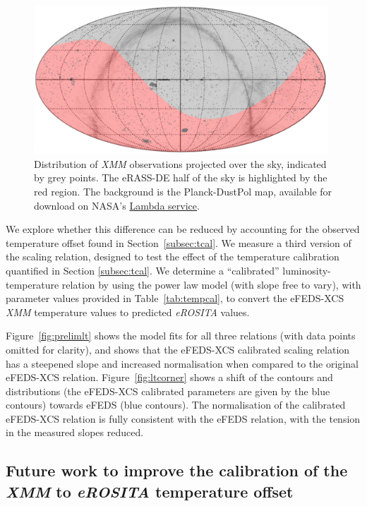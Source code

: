 \documentclass[fleqn,usenatbib]{mnras}
\begin{document}
\begin{figure}
    \centering
    \includegraphics[width=0.98\textwidth]{images/XCS_eRASSd.png}
    \caption[]{Distribution of {\em XMM} observations projected over the sky, indicated by grey points. The eRASS-DE half of the sky is highlighted by the red region. The background is the Planck-DustPol \citep[][]{dustpol} map, available for download on NASA's \href{http://lambda.gsfc.nasa.gov/data/footprint-maps/Planck_DustPol_Amp_256.fits.gz
}{Lambda service}.} 
    \label{fig:germanerassxmm}
\end{figure}

We explore whether this difference can be reduced by accounting for the observed temperature offset found in Section~\ref{subsec:tcal}. We measure a third version of the scaling relation, designed to test the effect of the temperature calibration quantified in Section \ref{subsec:tcal}.  We determine a ``calibrated'' luminosity-temperature relation by using the power law model (with slope free to vary), with parameter values provided in Table~\ref{tab:tempcal}, to convert the eFEDS-XCS {\em XMM} temperature values to predicted {\em eROSITA} values.

Figure~\ref{fig:prelimlt} shows the model fits for all three relations (with data points omitted for clarity), and shows that the eFEDS-XCS calibrated scaling relation has a steepened slope and increased normalisation when compared to the original eFEDS-XCS relation.  Figure~\ref{fig:ltcorner} shows a shift of the contours and distributions (the eFEDS-XCS calibrated parameters are given by the blue contours) towards eFEDS (blue contours).  The normalisation of the calibrated eFEDS-XCS relation is fully consistent with the eFEDS relation, with the tension in the measured slopes reduced.  

\subsection{Future work to improve the calibration of the {\em XMM} to {\em eROSITA} temperature offset}
\end{document}
